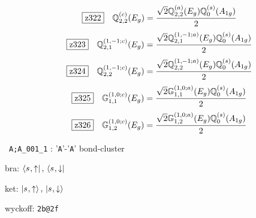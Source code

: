 \documentclass[fleqn,10pt,landscape]{jsarticle}
\begin{document}
\begin{dmath*}
\hspace*{3mm}\fbox{z322}\quad \mathbb{Q}_{2,2}^{(c)}(E_{g})=\frac{\sqrt{2} \mathbb{Q}_{2,2}^{(a)}(E_{g}) \mathbb{Q}_{0}^{(s)}(A_{1g})}{2}
\end{dmath*}
\begin{dmath*}
\hspace*{3mm}\fbox{z323}\quad \mathbb{Q}_{2,1}^{(1,-1;c)}(E_{g})=\frac{\sqrt{2} \mathbb{Q}_{2,1}^{(1,-1;a)}(E_{g}) \mathbb{Q}_{0}^{(s)}(A_{1g})}{2}
\end{dmath*}
\begin{dmath*}
\hspace*{3mm}\fbox{z324}\quad \mathbb{Q}_{2,2}^{(1,-1;c)}(E_{g})=\frac{\sqrt{2} \mathbb{Q}_{2,2}^{(1,-1;a)}(E_{g}) \mathbb{Q}_{0}^{(s)}(A_{1g})}{2}
\end{dmath*}
\begin{dmath*}
\hspace*{3mm}\fbox{z325}\quad \mathbb{G}_{1,1}^{(1,0;c)}(E_{g})=\frac{\sqrt{2} \mathbb{G}_{1,1}^{(1,0;a)}(E_{g}) \mathbb{Q}_{0}^{(s)}(A_{1g})}{2}
\end{dmath*}
\begin{dmath*}
\hspace*{3mm}\fbox{z326}\quad \mathbb{G}_{1,2}^{(1,0;c)}(E_{g})=\frac{\sqrt{2} \mathbb{G}_{1,2}^{(1,0;a)}(E_{g}) \mathbb{Q}_{0}^{(s)}(A_{1g})}{2}
\end{dmath*}
\vspace{5mm}

\noindent\textbullet\, \texttt{A;A_001_1} : '\texttt{A}'-'\texttt{A}' bond-cluster

\noindent\quad * bra: $\bra{s_{},\uparrow},\, \bra{s_{},\downarrow}$

\noindent\quad * ket: $\ket{s_{},\uparrow},\, \ket{s_{},\downarrow}$

\noindent\quad * wyckoff: \texttt{2b@2f}
\end{document}
